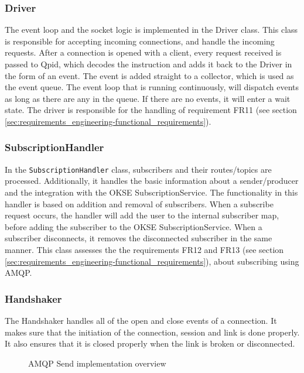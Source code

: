 \subsubsection{Driver}
The event loop and the socket logic is implemented in the Driver class. This class is responsible for accepting incoming connections, and handle the incoming requests. After a connection is opened with a client, every request received is passed to Qpid, which decodes the instruction and adds it back to the Driver in the form of an event. The event is added straight to a collector, which is used as the event queue. The event loop that is running continuously, will dispatch events as long as there are any in the queue. If there are no events, it will enter a wait state. The driver is responsible for the handling of requirement FR11 (see section \ref{sec:requirements_engineering-functional_requirements}).

\subsubsection{SubscriptionHandler}
In the \verb!SubscriptionHandler! class, subscribers and their routes/topics are processed. Additionally, it handles the basic information about a sender/producer and the integration with the OKSE SubscriptionService. The functionality in this handler is based on addition and removal of subscribers. When a subscribe request occurs, the handler will add the user to the internal subscriber map, before adding the subscriber to the OKSE SubscriptionService. When a subscriber disconnects, it removes the disconnected subscriber in the same manner. This class assesses the the requirements FR12 and FR13 (see section \ref{sec:requirements_engineering-functional_requirements}), about subscribing using AMQP.

\subsubsection{Handshaker}
The Handshaker handles all of the open and close events of a connection. It makes sure that the initiation of the connection, session and link is done properly. It also ensures that it is closed properly when the link is broken or disconnected.

\begin{center}
  \begin{figure}[ht!]
    \caption{AMQP Send implementation overview}
    \label{fig:amqp_send}
  \end{figure}
\end{center}

